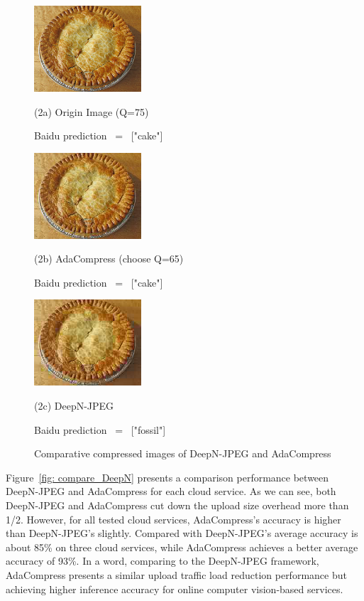 \begin{figure}[htbp]
    \vfill
    \vspace{0.4cm}
    
    \begin{minipage}{0.3\linewidth}
        \centerline{\includegraphics[width=4.0cm,trim=0 0 0 0,clip ]{figures/cake_q75.jpeg}}
        \centerline{(2a) Origin Image (Q=75)}
        \centerline{Baidu prediction \ = \ ["cake"]}
    \end{minipage}
    \hfill
    \begin{minipage}{0.2\linewidth}
        \centerline{\includegraphics[width=4.0cm,trim=0 0 0 0,clip ]{figures/cake_q65.jpeg}}
        \centerline{(2b) AdaCompress (choose Q=65)}
        \centerline{Baidu prediction \ = \ ["cake"]}
    \end{minipage}
    \hfill
    \begin{minipage}{0.3\linewidth}
        \centerline{\includegraphics[width=4.0cm,trim=0 0 0 0,clip ]{figures/cake_deepn.jpeg}}
        \centerline{(2c) DeepN-JPEG}
        \centerline{Baidu prediction \ = \ ["fossil"]}
    \end{minipage}
    \vspace{0.2cm}
    \caption{Comparative compressed images of DeepN-JPEG and AdaCompress}
    \label{fig: compare_image}
\end{figure}

Figure~\ref{fig: compare_DeepN} presents a comparison performance between DeepN-JPEG and AdaCompress for each cloud service. As we can see, both DeepN-JPEG and AdaCompress cut down the upload size overhead more than 1/2. However, for all tested cloud services, AdaCompress's accuracy is higher than DeepN-JPEG's slightly. Compared with DeepN-JPEG's average accuracy is about 85\% on three cloud services, while AdaCompress achieves a better average accuracy of 93\%. In a word, comparing to the DeepN-JPEG framework, AdaCompress presents a similar upload traffic load reduction performance but achieving higher inference accuracy for online computer vision-based services.

